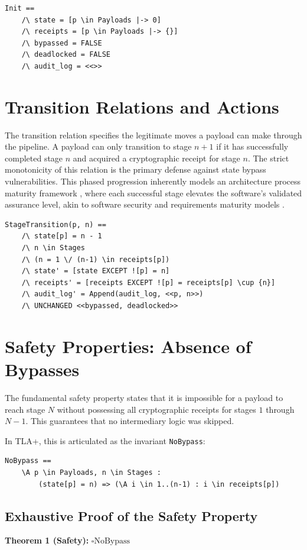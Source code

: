 \begin{verbatim}
Init == 
    /\ state = [p \in Payloads |-> 0]
    /\ receipts = [p \in Payloads |-> {}]
    /\ bypassed = FALSE
    /\ deadlocked = FALSE
    /\ audit_log = <<>>
\end{verbatim}

\section{Transition Relations and Actions}

The transition relation specifies the legitimate moves a payload can make through the pipeline. A payload can only transition to stage $n+1$ if it has successfully completed stage $n$ and acquired a cryptographic receipt for stage $n$. The strict monotonicity of this relation is the primary defense against state bypass vulnerabilities. This phased progression inherently models an architecture process maturity framework \cite{ref_AnArchitectureP27}, where each successful stage elevates the software's validated assurance level, akin to software security and requirements maturity models \cite{ref_TowardaResearch29, ref_SoftwareRequire28}.

\begin{verbatim}
StageTransition(p, n) ==
    /\ state[p] = n - 1
    /\ n \in Stages
    /\ (n = 1 \/ (n-1) \in receipts[p])
    /\ state' = [state EXCEPT ![p] = n]
    /\ receipts' = [receipts EXCEPT ![p] = receipts[p] \cup {n}]
    /\ audit_log' = Append(audit_log, <<p, n>>)
    /\ UNCHANGED <<bypassed, deadlocked>>
\end{verbatim}

\section{Safety Properties: Absence of Bypasses}
The fundamental safety property states that it is impossible for a payload to reach stage $N$ without possessing all cryptographic receipts for stages $1$ through $N-1$. This guarantees that no intermediary logic was skipped.

In TLA+, this is articulated as the invariant \texttt{NoBypass}:
\begin{verbatim}
NoBypass == 
    \A p \in Payloads, n \in Stages :
        (state[p] = n) => (\A i \in 1..(n-1) : i \in receipts[p])
\end{verbatim}

\subsection{Exhaustive Proof of the Safety Property}
\textbf{Theorem 1 (Safety):} $\square \text{NoBypass}$

